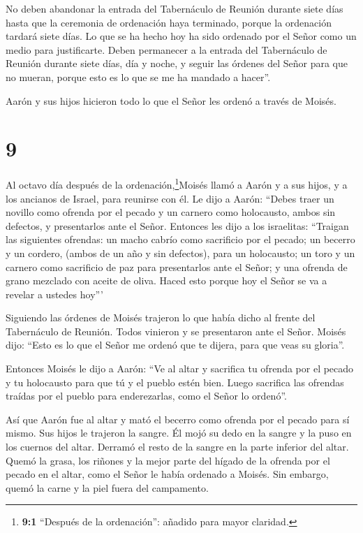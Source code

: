  No deben abandonar la entrada del Tabernáculo de Reunión
durante siete días hasta que la ceremonia de ordenación haya terminado,
porque la ordenación tardará siete días.  Lo que se ha
hecho hoy ha sido ordenado por el Señor como un medio para justificarte.
 Deben permanecer a la entrada del Tabernáculo de Reunión
durante siete días, día y noche, y seguir las órdenes del Señor para que
no mueran, porque esto es lo que se me ha mandado a hacer''.

 Aarón y sus hijos hicieron todo lo que el Señor les ordenó
a través de Moisés.

\hypertarget{section-8}{%
\section{9}\label{section-8}}

 Al octavo día después de la ordenación,\footnote{\textbf{9:1}
  ``Después de la ordenación'': añadido para mayor claridad.}Moisés
llamó a Aarón y a sus hijos, y a los ancianos de Israel, para reunirse
con él.  Le dijo a Aarón: ``Debes traer un novillo como
ofrenda por el pecado y un carnero como holocausto, ambos sin defectos,
y presentarlos ante el Señor.  Entonces les dijo a los
israelitas: ``Traigan las siguientes ofrendas: un macho cabrío como
sacrificio por el pecado; un becerro y un cordero, (ambos de un año y
sin defectos), para un holocausto;  un toro y un carnero
como sacrificio de paz para presentarlos ante el Señor; y una ofrenda de
grano mezclado con aceite de oliva. Haced esto porque hoy el Señor se va
a revelar a ustedes hoy'''

 Siguiendo las órdenes de Moisés trajeron lo que había dicho
al frente del Tabernáculo de Reunión. Todos vinieron y se presentaron
ante el Señor.  Moisés dijo: ``Esto es lo que el Señor me
ordenó que te dijera, para que veas su gloria''.

 Entonces Moisés le dijo a Aarón: ``Ve al altar y sacrifica
tu ofrenda por el pecado y tu holocausto para que tú y el pueblo estén
bien. Luego sacrifica las ofrendas traídas por el pueblo para
enderezarlas, como el Señor lo ordenó''.

 Así que Aarón fue al altar y mató el becerro como ofrenda
por el pecado para sí mismo.  Sus hijos le trajeron la
sangre. Él mojó su dedo en la sangre y la puso en los cuernos del altar.
Derramó el resto de la sangre en la parte inferior del altar.
 Quemó la grasa, los riñones y la mejor parte del hígado de
la ofrenda por el pecado en el altar, como el Señor le había ordenado a
Moisés.  Sin embargo, quemó la carne y la piel fuera del
campamento.


